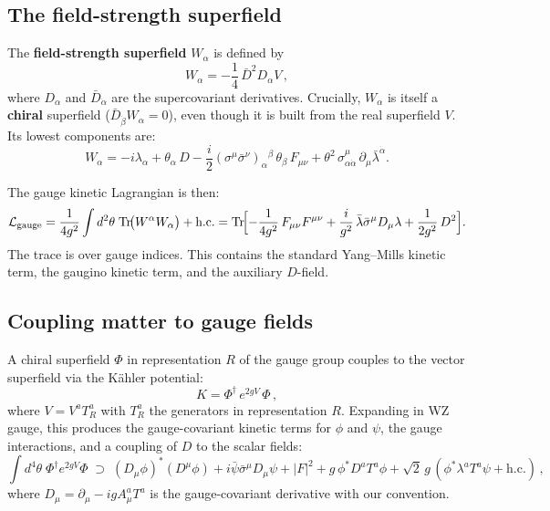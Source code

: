 \documentclass[11pt,a4paper]{article}
\begin{document}
\subsection{The field-strength superfield}
\label{sec:field-strength}

\begin{definition}
\label{def:Walpha}
The \textbf{field-strength superfield} $W_\alpha$ is defined by
\begin{equation}
  W_\alpha = -\frac{1}{4}\, \bar{D}^2 D_\alpha V\,,
  \label{eq:Walpha-def}
\end{equation}
where $D_\alpha$ and $\bar{D}_{\dot\alpha}$ are the supercovariant
derivatives.  Crucially, $W_\alpha$ is itself a \textbf{chiral} superfield
($\bar{D}_{\dot\beta} W_\alpha = 0$), even though it is built from the
real superfield $V$.  Its lowest components are:
\begin{equation}
  W_\alpha = -i\lambda_\alpha + \theta_\alpha\, D
  - \frac{i}{2}(\sigma^\mu \bar\sigma^\nu)_\alpha{}^\beta\, \theta_\beta\, F_{\mu\nu}
  + \theta^2\, \sigma^\mu_{\alpha\dot\alpha}\, \partial_\mu \bar\lambda^{\dot\alpha}.
  \label{eq:Walpha-components}
\end{equation}
\end{definition}

The gauge kinetic Lagrangian is then:
\begin{equation}
  \mathcal{L}_{\text{gauge}}
  = \frac{1}{4g^2} \int d^2\theta\; \mathrm{Tr}\!\bigl(W^\alpha W_\alpha\bigr) + \text{h.c.}
  = \mathrm{Tr}\!\Bigl[
    -\frac{1}{4g^2}\, F_{\mu\nu} F^{\mu\nu}
    + \frac{i}{g^2}\, \bar\lambda \bar\sigma^\mu D_\mu \lambda
    + \frac{1}{2g^2}\, D^2
  \Bigr].
  \label{eq:L-gauge}
\end{equation}
The trace is over gauge indices.  This contains the standard Yang--Mills
kinetic term, the gaugino kinetic term, and the auxiliary $D$-field.

\subsection{Coupling matter to gauge fields}
\label{sec:gauge-matter}

A chiral superfield $\Phi$ in representation $R$ of the gauge group
couples to the vector superfield via the K\"ahler potential:
\begin{equation}
  K = \Phi^\dagger\, e^{2gV}\, \Phi\,,
  \label{eq:kahler-gauge}
\end{equation}
where $V = V^a T^a_R$ with $T^a_R$ the generators in representation $R$.
Expanding in WZ gauge, this produces the gauge-covariant kinetic terms
for $\phi$ and $\psi$, the gauge interactions, and a coupling of $D$
to the scalar fields:
\begin{equation}
  \int d^4\theta\; \Phi^\dagger e^{2gV} \Phi
  \;\supset\;
  (D_\mu \phi)^* (D^\mu \phi) + i\bar\psi \bar\sigma^\mu D_\mu \psi
  + |F|^2 + g\, \phi^* D^a T^a \phi
  + \sqrt{2}\, g\, (\phi^* \lambda^a T^a \psi + \text{h.c.})\,,
  \label{eq:kahler-gauge-components}
\end{equation}
where $D_\mu = \partial_\mu - ig A_\mu^a T^a$ is the gauge-covariant
derivative with our convention.
\end{document}
